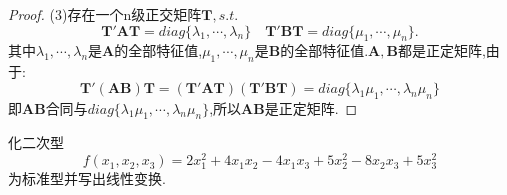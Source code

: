 \documentclass[lang=cn,11pt,normal]{elegantbook}
\begin{document}
	\begin{proof}
		(3)存在一个n级正交矩阵$\boldsymbol{T},s.t.$
		$$
		\boldsymbol{T}'\boldsymbol{AT}=diag\{\lambda_1,\cdots,\lambda_n\}\quad\boldsymbol{T}'\boldsymbol{BT}=diag\{\mu_1,\cdots,\mu_n\}.
		$$
		其中$\lambda_1,\cdots,\lambda_n$是$\boldsymbol{A}$的全部特征值,$\mu_1,\cdots,\mu_n$是$\boldsymbol{B}$的全部特征值.$\boldsymbol{A},\boldsymbol{B}$都是正定矩阵,由于:
		$$
		\boldsymbol{T}'(\boldsymbol{AB})\boldsymbol{T}=(\boldsymbol{T}'\boldsymbol{AT})(\boldsymbol{T}'\boldsymbol{BT})=diag\{\lambda_1\mu_1,\cdots,\lambda_n\mu_n \}
		$$
		即$\boldsymbol{AB}$合同与$diag\{\lambda_1\mu_1,\cdots,\lambda_n\mu_n \}$,所以$\boldsymbol{AB}$是正定矩阵.
	\end{proof}
	\begin{exercise}
		化二次型
		$$
		f(x_1,x_2,x_3)=2x_1^2+4x_1x_2-4x_1x_3+5x_2^2-8x_2x_3+5x_3^2
		$$
		为标准型并写出线性变换.
	\end{exercise}
\end{document}

